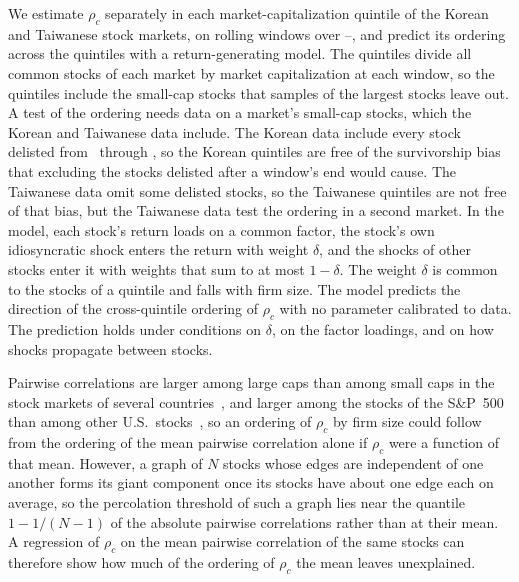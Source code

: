\documentclass[a4paper,fleqn]{cas-sc}
\begin{document}
We estimate $\rho_c$ separately in each market-capitalization quintile of the Korean and Taiwanese stock markets, on rolling windows over \paperSampleStart--\paperSampleEnd, and predict its ordering across the quintiles with a return-generating model. The quintiles divide all common stocks of each market by market capitalization at each window, so the quintiles include the small-cap stocks that samples of the largest stocks leave out. A test of the ordering needs data on a market's small-cap stocks, which the Korean and Taiwanese data include. The Korean data include every stock delisted from \paperSampleStart\ through \paperSampleEnd, so the Korean quintiles are free of the survivorship bias that excluding the stocks delisted after a window's end would cause. The Taiwanese data omit some delisted stocks, so the Taiwanese quintiles are not free of that bias, but the Taiwanese data test the ordering in a second market. In the model, each stock's return loads on a common factor, the stock's own idiosyncratic shock enters the return with weight $\delta$, and the shocks of other stocks enter it with weights that sum to at most $1 - \delta$. The weight $\delta$ is common to the stocks of a quintile and falls with firm size. The model predicts the direction of the cross-quintile ordering of $\rho_c$ with no parameter calibrated to data. The prediction holds under conditions on $\delta$, on the factor loadings, and on how shocks propagate between stocks.

Pairwise correlations are larger among large caps than among small caps in the stock markets of several countries~\citep{ciliberti2019size}, and larger among the stocks of the S\&P~500 than among other U.S.\ stocks~\citep{sullivan2012index}, so an ordering of $\rho_c$ by firm size could follow from the ordering of the mean pairwise correlation alone if $\rho_c$ were a function of that mean. However, a graph of $N$ stocks whose edges are independent of one another forms its giant component once its stocks have about one edge each on average, so the percolation threshold of such a graph lies near the quantile $1 - 1/(N-1)$ of the absolute pairwise correlations rather than at their mean. A regression of $\rho_c$ on the mean pairwise correlation of the same stocks can therefore show how much of the ordering of $\rho_c$ the mean leaves unexplained.
\end{document}
